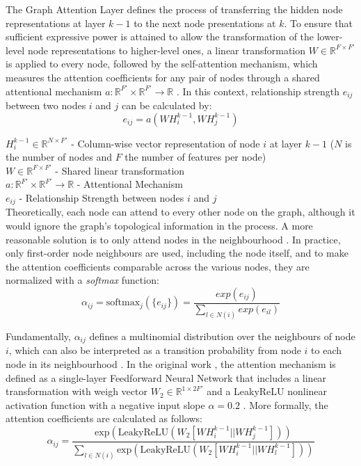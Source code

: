 \documentclass[11pt,a4paper]{article}
\begin{document}
The Graph Attention Layer defines the process of transferring the hidden node representations at layer $k - 1$ to the next node presentations at $k$. To ensure that sufficient expressive power is attained to allow the transformation of the lower-level node representations to higher-level ones, a linear transformation $W \in \mathbb{R}^{F \times F'}$ is applied to every node, followed by the self-attention mechanism, which measures the attention coefficients for any pair of nodes through a shared attentional mechanism $a: \mathbb{R}^{F'} \times \mathbb{R}^{F'} \rightarrow \mathbb{R}$ \cite{tangGraphNeuralNetworks2022, velickovicGraphAttentionNetworks2018}. In this context, relationship strength $e_{ij}$ between two nodes $i$ and $j$ can be calculated by:
\begin{equation}
e_{ij} = a(W H^{k - 1}_i, W H^{k - 1}_j)
\end{equation}

$H^{k - 1}_i \in \mathbb{R}^{N \times F'}$ - Column-wise vector representation of node $i$ at layer $k - 1$ ($N$ is the number of nodes and $F$ the number of features per node) \\
$W \in \mathbb{R}^{F \times F'}$ - Shared linear transformation \\
$a: \mathbb{R}^{F'} \times \mathbb{R}^{F'} \rightarrow \mathbb{R}$ - Attentional Mechanism \\
$e_{ij}$ - Relationship Strength between nodes $i$ and $j$ \\

Theoretically, each node can attend to every other node on the graph, although it would ignore the graph's topological information in the process. A more reasonable solution is to only attend nodes in the neighbourhood \cite{velickovicGraphAttentionNetworks2018, tangGraphNeuralNetworks2022}. In practice, only first-order node neighbours are used, including the node itself, and to make the attention coefficients comparable across the various nodes, they are normalized with a \textit{softmax} function:
$$ \alpha_{ij} = \text{softmax}_j(\{e_{ij}\}) = \frac{exp(e_{ij})}{\sum_{l \in N(i)} exp(e_{il})}$$
 
Fundamentally, $\alpha_{ij}$ defines a multinomial distribution over the neighbours of node $i$, which can also be interpreted as a transition probability from node $i$ to each node in its neighbourhood \cite{tangGraphNeuralNetworks2022}. 
In the original work \cite{velickovicGraphAttentionNetworks2018}, the attention mechanism is defined as a single-layer Feedforward Neural Network that includes a linear transformation with weigh vector $W_2 \in \mathbb{R}^{1 \times 2 F'}$ and a LeakyReLU nonlinear activation function with a negative input slope $\alpha = 0.2$ \cite{tangGraphNeuralNetworks2022, velickovicGraphAttentionNetworks2018}. More formally, the attention coefficients are calculated as follows:
\begin{equation}
    \alpha_{ij} = \frac{ \text{exp}( \text{LeakyReLU}( W_2 [W H^{k - 1}_i || W H^{k - 1}_j]))}{ \sum_{l \in N(i)} \text{exp}( \text{LeakyReLU}( W_2 [W H^{k - 1}_i || W H^{k - 1}_l])) }
\end{equation}
 
\end{document}
